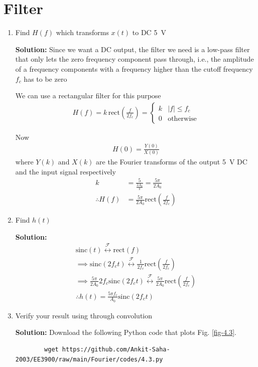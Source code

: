 \documentclass[journal,12pt,twocolumn]{IEEEtran}
\newcommand{\solution}{\noindent \textbf{Solution: }}
\providecommand{\abs}[1]{\left\vert#1\right\vert}
\providecommand{\system}[1]{\overset{\mathcal{#1}}{ \longleftrightarrow}}
\providecommand{\rect}[1]{\mathrm{rect}\ensuremath{\left(#1\right)}}
\providecommand{\sinc}[1]{\mathrm{sinc}\ensuremath{\left(#1\right)}}
\numberwithin{equation}{section}
\numberwithin{figure}{section}
\renewcommand\thesection{\arabic{section}}
\begin{document}
	\section{Filter}
	\begin{enumerate}[label=\thesection.\arabic*,ref=\thesection.\theenumi]
	\item Find $H(f)$ which transforms $x(t)$ to DC \SI{5}{\volt}
	
	\solution Since we want a DC output, the filter we need is a low-pass filter that only lets the zero frequency component pass through, i.e., the amplitude of a  frequency components with a frequency higher than the cutoff frequency $f_c$ has to be zero
	
	We can use a rectangular filter for this purpose
	\begin{align}
		H(f) = k\,\rect{\frac{f}{2f_c}} =
		\begin{cases}
			k & \abs{f} \le f_c \\
			0 & \text{otherwise}
		\end{cases}
	\end{align}
	
	Now
	\begin{align}
		H(0) = \frac{Y(0)}{X(0)}
	\end{align}
	where $Y(k)$ and $X(k)$ are the Fourier transforms of the output \SI{5}{\volt} DC and the input signal respectively
	\begin{align}
		k &= \frac{5}{\frac{2A_0}{\pi}} = \frac{5\pi}{2A_0} \\
		\therefore H(f) &= \frac{5\pi}{2A_0}\rect{\frac{f}{2f_c}}
	\end{align}
	
	
	\item Find $h(t)$
	
	\solution 
	\begin{gather}
		\sinc{t} \system{F} \rect{f} \\
		\implies \sinc{2f_ct} \system{F} \frac{1}{2f_c}\rect{\frac{f}{2f_c}} \\
		\implies \frac{5\pi}{2A_0} 2f_c \sinc{2f_ct} \system{F} \frac{5\pi}{2A_0}\rect{\frac{f}{2f_c}} \\
		\therefore h(t) = \frac{5\pi f_c}{A_0} \sinc{2f_ct}
	\end{gather}
	
	\item Verify your result using  through convolution
	
	\solution Download the following Python code that plots Fig. \ref{fig-4.3}.
	\begin{lstlisting}
		wget https://github.com/Ankit-Saha-2003/EE3900/raw/main/Fourier/codes/4.3.py
	\end{lstlisting}
	

\end{enumerate}
\end{document}
